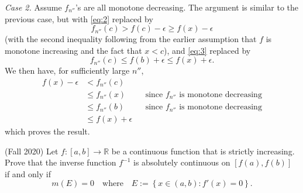 \documentclass[answers]{exam}
\theoremstyle{problemstyle}
\newcommand{\1}[1]{\textbf{1}_{\left[#1\right]}} %
\begin{document}
\begin{questions}
\begin{solution}
\textit{Case 2.} Assume $f_{n''}$'s are all monotone decreasing. The argument is
similar to the previous case, but with \eqref{eq:2} replaced by
\begin{equation*}
  f_{n''}(c)>f(c)-\epsilon \geq f(x)-\epsilon
\end{equation*}
(with the second inequality following from the earlier assumption that $f$ is
monotone increasing and the fact that $x<c$), and \eqref{eq:3} replaced by
\begin{equation*}
  f_{n''}(c) \leq f(b) +\epsilon \leq f(x)+ \epsilon.
\end{equation*}
We then have, for sufficiently large $n''$, 
\begin{align*}
  f(x)-\epsilon
  &< f_{n''}(c)\\
  &\leq f_{n''}(x)
  &&\text{since $f_{n''}$ is monotone decreasing}\\
  &\leq f_{n''}(b)
  &&\text{since $f_{n''}$ is monotone decreasing}\\
  &\leq f(x)+\epsilon
\end{align*}
which proves the result.
\end{solution}

\question (Fall 2020) Let $f:[a,b] \to \mathbb{R}$ be a continuous function that is strictly
increasing. Prove that the inverse function $f^{-1}$ is absolutely continuous on
$[f(a),f(b)]$ if and only if
\begin{equation*}
  m(E) = 0 \quad \text{where} \quad E:= \left\{ x\in (a,b): f'(x)=0 \right\}.
\end{equation*}


\end{questions}
\end{document}
